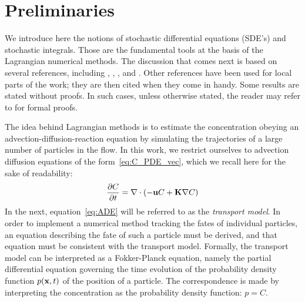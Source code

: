 \section{Preliminaries}
We introduce here the notions of stochastic differential equations (SDE's) and stochastic integrals. Those are the fundamental tools at the basis of the Lagrangian numerical methods. The discussion that comes next is based on several references, including \cite{gardiner1985stochastic}, \cite{heemink2011slides}, \cite{keunings}, \cite{spivakovskaya2007lagrangian} and \cite{shah2017tracing}. Other references have been used for local parts of the work; they are then cited when they come in handy. Some results are stated without proofs. In such cases, unless otherwise stated, the reader may refer to \cite{gardiner1985stochastic} for formal proofs.

The idea behind Lagrangian methods is to estimate the concentration obeying an advection-diffusion-reaction equation by simulating the trajectories of a large number of particles in the flow. In this work, we restrict ourselves to advection diffusion equations of the form~\eqref{eq:C_PDE_vec}, which we recall here for the sake of readability:
\begin{equation} \label{eq:ADE}
	\frac{\partial C}{\partial t} = \nabla \cdot (-\mathbf u C + \mathbf K \nabla C)
\end{equation}
In the next, equation~\eqref{eq:ADE} will be referred to as the \textit{transport model}. In order to implement a numerical method tracking the fates of individual particles, an equation describing the fate of such a particle must be derived, and that equation must be consistent with the transport model. Formally, the transport model can be interpreted as a Fokker-Planck equation, namely the partial differential equation governing the time evolution of the probability density function $p(\mathbf x,t)$ of the position of a particle. The correspondence is made by interpreting the concentration as the probability density function: $p=C$. 

